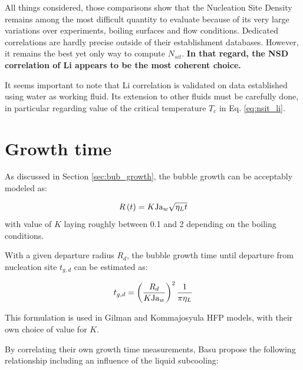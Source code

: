 \npar
All things considered, those comparisons show that the Nucleation Site Density remains among the most difficult quantity to evaluate because of its very large variations over experiments, boiling surfaces and flow conditions. Dedicated correlations are hardly precise outside of their establishment databases. However, it remains the best yet only way to compute $N_{sit}$. \textbf{In that regard, the NSD correlation of Li \etal appears to be the most coherent choice.}

\begin{note*}{}
It seems important to note that Li \etal correlation is validated on data established using water as working fluid. Its extension to other fluids must be carefully done, in particular regarding value of the critical temperature $T_{c}$ in Eq. \ref{eq:nsit_li}.
\end{note*}











\section{Growth time}
\label{sec:growth_time}


As discussed in Section \ref{sec:bub_growth}, the bubble growth can be acceptably modeled as:

\begin{equation}
R\left( t \right) = K\mathrm{Ja}_{w} \sqrt{\eta_{L}t}
\end{equation}
with value of $K$ laying roughly between 0.1 and 2 depending on the boiling conditions.

\npar

With a given departure radius $R_{d}$, the bubble growth time until departure from nucleation site $t_{g,d}$ can be estimated as:

\begin{equation}
t_{g,d} = \left( \frac{R_{d}}{K \mathrm{Ja}_{w}} \right)^{2} \frac{1}{\pi \eta_{L}}
\label{eq:tg_dep}
\end{equation}

\begin{note*}{}
This formulation is used in Gilman \cite{gilman_development_2014} and Kommajosyula \cite{kommajosyula_development_2020} HFP models, with their own choice of value for $K$.
\end{note*}

By correlating their own growth time measurements, Basu \etal \cite{basu_wall_2005} propose the following relationship including an influence of the liquid subcooling:

